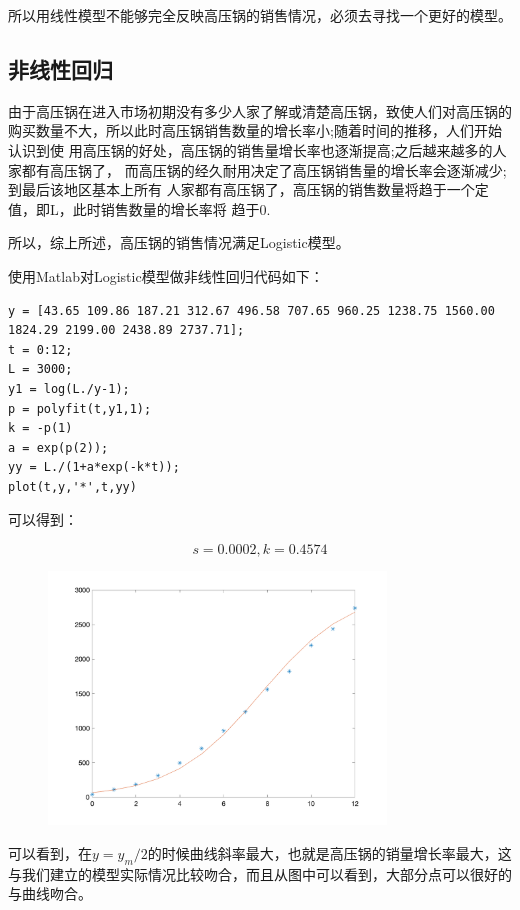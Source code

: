 \documentclass{article}
\begin{document}
所以用线性模型不能够完全反映高压锅的销售情况，必须去寻找一个更好的模型。

\subsection{非线性回归}

由于高压锅在进入市场初期没有多少人家了解或清楚高压锅，致使人们对高压锅的购买数量不大，所以此时高压锅销售数量的增长率小;随着时间的推移，人们开始认识到使 用高压锅的好处，高压锅的销售量增长率也逐渐提高;之后越来越多的人家都有高压锅了， 而高压锅的经久耐用决定了高压锅销售量的增长率会逐渐减少;到最后该地区基本上所有 人家都有高压锅了，高压锅的销售数量将趋于一个定值，即L，此时销售数量的增长率将 趋于0.

所以，综上所述，高压锅的销售情况满足Logistic模型。

使用Matlab对Logistic模型做非线性回归代码如下：


\begin{lstlisting}
y = [43.65 109.86 187.21 312.67 496.58 707.65 960.25 1238.75 1560.00 1824.29 2199.00 2438.89 2737.71];
t = 0:12;
L = 3000;
y1 = log(L./y-1);
p = polyfit(t,y1,1);
k = -p(1)
a = exp(p(2));
yy = L./(1+a*exp(-k*t));
plot(t,y,'*',t,yy)

\end{lstlisting}

可以得到：

$$s = 0.0002, k=0.4574$$

\begin{figure}[H]
    \centering
    \includegraphics[width=0.8\textwidth]{pic25.png}
\end{figure}

可以看到，在$y=y_m/2$的时候曲线斜率最大，也就是高压锅的销量增长率最大，这与我们建立的模型实际情况比较吻合，而且从图中可以看到，大部分点可以很好的与曲线吻合。
\end{document}
